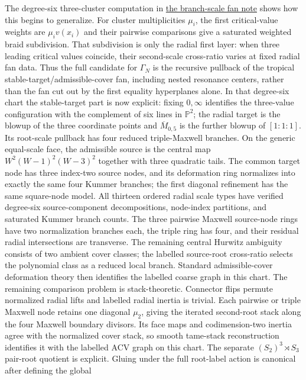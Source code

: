 \documentclass[11pt]{article}
\begin{document}
The degree-six three-cluster computation in
\href{../../extended-geometry/BRANCH_SCALE_FAN.md}{the branch-scale fan
note} shows how this begins to generalize.  For cluster multiplicities
$\mu_i$, the first critical-value weights are $\mu_i v(x_i)$ and their
pairwise comparisons give a saturated weighted braid subdivision.  That
subdivision is only the radial first layer: when three leading critical
values coincide, their second-scale cross-ratio varies at fixed radial fan
data.  Thus the full candidate for $\Gamma_N$ is the recursive pullback of
the tropical stable-target/admissible-cover fan, including nested resonance
centers, rather than the fan cut out by the first equality hyperplanes alone.
In that degree-six chart the stable-target part is now explicit: fixing
$0,\infty$ identifies the three-value configuration with the complement of
six lines in $\mathbb P^2$; the radial target is the blowup of the three
coordinate points and $\overline M_{0,5}$ is the further blowup of
$[1:1:1]$.  Its root-scale pullback has four reduced triple-Maxwell branches.
On the generic equal-scale face, the admissible source is the central map
$W^2(W-1)^2(W-3)^2$ together with three quadratic tails.  The common target
node has three index-two source nodes, and its deformation ring normalizes
into exactly the same four Kummer branches; the first diagonal refinement
has the same square-node model.  All thirteen ordered radial scale types
have verified degree-six source-component decompositions, node-index
partitions, and saturated Kummer branch counts.  The three pairwise Maxwell
source-node rings have two normalization branches each, the triple ring has
four, and their residual radial intersections are transverse.  The remaining
central Hurwitz ambiguity consists of two ambient cover classes; the labelled
source-root cross-ratio selects the polynomial class as a reduced local
branch.  Standard admissible-cover deformation theory then identifies the
labelled coarse graph in this chart.  The remaining comparison problem is
stack-theoretic.  Connector flips permute normalized radial lifts and
labelled radial inertia is trivial.  Each pairwise or triple Maxwell node
retains one diagonal $\mu_2$, giving the iterated second-root stack along
the four Maxwell boundary divisors.  Its face maps and codimension-two
inertia agree with the normalized cover stack, so smooth tame-stack
reconstruction identifies it with the labelled ACV graph on this chart.
The separate $(S_2)^3\rtimes S_3$ pair-root quotient is explicit.  Gluing
under the full root-label action is canonical after defining the global
\end{document}
